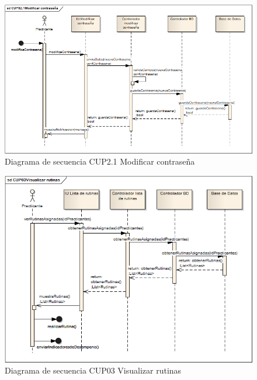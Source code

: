 \begin{figure}[H]
	\begin{center}
		\includegraphics[scale=0.6]{./Figuras/Secuencias/CUP02_1Modificar_contrasena}
	\end{center}
	\caption{Diagrama de secuencia CUP2.1 Modificar contraseña}
	\label{fig:SE_CUP021}
\end{figure}

\begin{figure}[H]
	\begin{center}
		\includegraphics[scale=0.7]{./Figuras/Secuencias/CUP03Visualizar_rutinas}
	\end{center}
	\caption{Diagrama de secuencia CUP03 Visualizar rutinas}
	\label{fig:SE_CUP03}
\end{figure}

